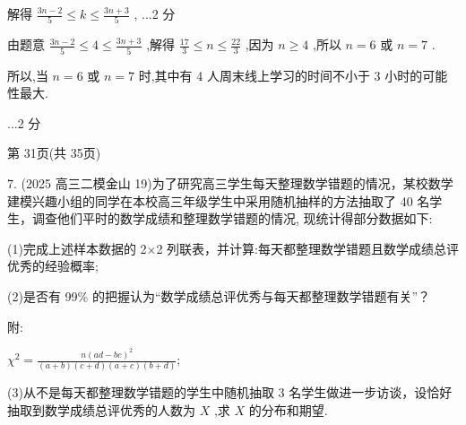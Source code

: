 \documentclass[10pt]{article}
\begin{document}
解得 \(\frac{{3n} - 2}{5} \leq  k \leq  \frac{{3n} + 3}{5}\) , ...2 分

由题意 \(\frac{{3n} - 2}{5} \leq  4 \leq  \frac{{3n} + 3}{5}\) ,解得 \(\frac{17}{3} \leq  n \leq  \frac{22}{3}\) ,因为 \(n \geq  4\) ,所以 \(n = 6\) 或 \(n = 7\) .

所以,当 \(n = 6\) 或 \(n = 7\) 时,其中有 4 人周末线上学习的时间不小于 3 小时的可能性最大.

...2 分

第 31页(共 35页)

7. (2025 高三二模金山 19)为了研究高三学生每天整理数学错题的情况，某校数学建模兴趣小组的同学在本校高三年级学生中采用随机抽样的方法抽取了 40 名学生，调查他们平时的数学成绩和整理数学错题的情况, 现统计得部分数据如下:

\begin{center}
\end{center}

(1)完成上述样本数据的 2×2 列联表，并计算:每天都整理数学错题且数学成绩总评优秀的经验概率;

(2)是否有 99\% 的把握认为“数学成绩总评优秀与每天都整理数学错题有关”？

\begin{center}
\end{center}

附:

\({\chi }^{2} = \frac{n{\left( ad - bc\right) }^{2}}{\left( {a + b}\right) \left( {c + d}\right) \left( {a + c}\right) \left( {b + d}\right) };\)

(3)从不是每天都整理数学错题的学生中随机抽取 3 名学生做进一步访谈，设恰好抽取到数学成绩总评优秀的人数为 \(X\) ,求 \(X\) 的分布和期望.
\end{document}
